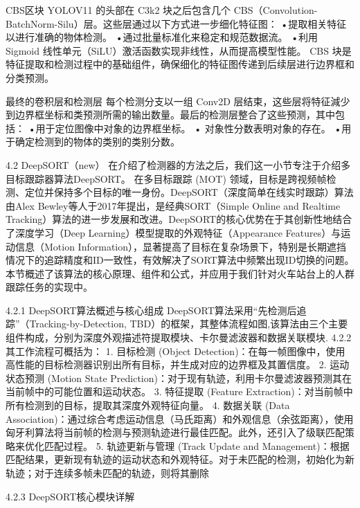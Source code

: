 CBS区块 YOLOV11 的头部在 C3k2 块之后包含几个 CBS（Convolution-BatchNorm-Silu）\cite{81_noauthor_what_2024}层。这些层通过以下方式进一步细化特征图： 
    •提取相关特征以进行准确的物体检测。 
    •通过批量标准化来稳定和规范数据流。
    •利用 Sigmoid 线性单元（SiLU）激活函数实现非线性，从而提高模型性能。
CBS 块是特征提取和检测过程中的基础组件，确保细化的特征图传递到后续层进行边界框和分类预测。 

最终的卷积层和检测层 每个检测分支以一组 Conv2D 层结束，这些层将特征減少到边界框坐标和类预测所需的输出数量。最后的检测层整合了这些预测，其中包括： 
    •用于定位图像中对象的边界框坐标。 
    • 对象性分数表明对象的存在。 
    •用于确定检测到的物体的类别的类别分数。


4.2 DeepSORT（new）
在介绍了检测器的方法之后，我们这一小节专注于介绍多目标跟踪器算法DeepSORT。
在多目标跟踪 (MOT) 领域，目标是跨视频帧检测、定位并保持多个目标的唯一身份。DeepSORT（深度简单在线实时跟踪）算法由Alex Bewley等人于2017年提出，是经典SORT（Simple Online and Realtime Tracking）算法的进一步发展和改进。DeepSORT的核心优势在于其创新性地结合了深度学习（Deep Learning）模型提取的外观特征（Appearance Features）与运动信息（Motion Information），显著提高了目标在复杂场景下，特别是长期遮挡情况下的追踪精度和ID一致性，有效解决了SORT算法中频繁出现ID切换的问题。本节概述了该算法的核心原理、组件和公式，并应用于我们针对火车站台上的人群跟踪任务的实现中。

4.2.1 DeepSORT算法概述与核心组成
DeepSORT算法采用“先检测后追踪”（Tracking-by-Detection, TBD）的框架，其整体流程如图\cite{212},该算法由三个主要组件构成，分别为深度外观描述符提取模块、卡尔曼滤波器和数据关联模块.
4.2.2 其工作流程可概括为：
1. 目标检测 (Object Detection)：在每一帧图像中，使用高性能的目标检测器识别出所有目标，并生成对应的边界框及其置信度。\cite{174}
2. 运动状态预测 (Motion State Prediction)：对于现有轨迹，利用卡尔曼滤波器预测其在当前帧中的可能位置和运动状态。\cite{174}
3. 特征提取 (Feature Extraction)：对当前帧中所有检测到的目标，提取其深度外观特征向量。\cite{179}
4. 数据关联 (Data Association)：通过综合考虑运动信息（马氏距离）和外观信息（余弦距离），使用匈牙利算法将当前帧的检测与预测轨迹进行最佳匹配。此外，还引入了级联匹配策略来优化匹配过程。\cite{104}
5. 轨迹更新与管理 (Track Update and Management)：根据匹配结果，更新现有轨迹的运动状态和外观特征。对于未匹配的检测，初始化为新轨迹；对于连续多帧未匹配的轨迹，则将其删除

4.2.3 DeepSORT核心模块详解

